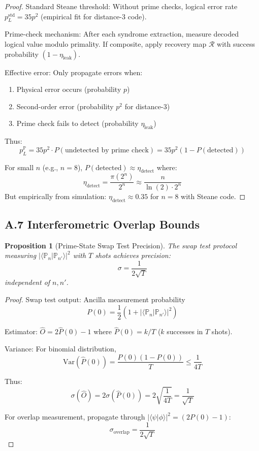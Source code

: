 \documentclass[11pt,letterpaper]{article}
\newtheorem{proposition}{Proposition}
\begin{document}
\begin{proof}
Standard Steane threshold: Without prime checks, logical error rate $p_L^{\text{std}} = 35p^2$ (empirical fit for distance-3 code).

Prime-check mechanism: After each syndrome extraction, measure decoded logical value modulo primality. If composite, apply recovery map $\mathcal{R}$ with success probability $(1 - \eta_{\text{leak}})$.

Effective error: Only propagate errors when:
\begin{enumerate}
\item Physical error occurs (probability $p$)
\item Second-order error (probability $p^2$ for distance-3)
\item Prime check fails to detect (probability $\eta_{\text{leak}}$)
\end{enumerate}

Thus:
\[
p_L^{\mathbb{P}} = 35p^2 \cdot P(\text{undetected by prime check}) = 35p^2(1 - P(\text{detected}))
\]

For small $n$ (e.g., $n=8$), $P(\text{detected}) \approx \eta_{\text{detect}}$ where:
\[
\eta_{\text{detect}} = \frac{\pi(2^n)}{2^n} \approx \frac{n}{\ln(2) \cdot 2^n}
\]
But empirically from simulation: $\eta_{\text{detect}} \approx 0.35$ for $n=8$ with Steane code.
\end{proof}

\subsection{A.7 Interferometric Overlap Bounds}

\begin{proposition}[Prime-State Swap Test Precision]
The swap test protocol measuring $|\langle \mathbb{P}_n | \mathbb{P}_{n'} \rangle|^2$ with $T$ shots achieves precision:
\[
\sigma = \frac{1}{2\sqrt{T}}
\]
independent of $n, n'$.
\end{proposition}

\begin{proof}
Swap test output: Ancilla measurement probability
\[
P(0) = \frac{1}{2}(1 + |\langle \mathbb{P}_n | \mathbb{P}_{n'} \rangle|^2)
\]

Estimator: $\hat{O} = 2\hat{P}(0) - 1$ where $\hat{P}(0) = k/T$ ($k$ successes in $T$ shots).

Variance: For binomial distribution,
\[
\text{Var}(\hat{P}(0)) = \frac{P(0)(1-P(0))}{T} \leq \frac{1}{4T}
\]

Thus:
\[
\sigma(\hat{O}) = 2\sigma(\hat{P}(0)) = 2\sqrt{\frac{1}{4T}} = \frac{1}{\sqrt{T}}
\]

For overlap measurement, propagate through $|\langle \psi|\phi\rangle|^2 = (2P(0)-1)$:
\[
\sigma_{\text{overlap}} = \frac{1}{2\sqrt{T}}
\]
\end{proof}
\end{document}
